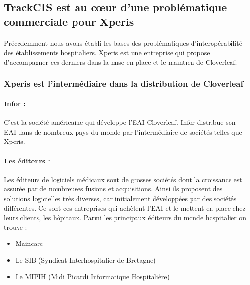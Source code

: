	\subsection{TrackCIS est au cœur d'une problématique commerciale pour Xperis}
		\paragraph{}
		Précédemment nous avons établi les bases des problématiques d'interopérabilité
		des établissements hospitaliers. Xperis est une entreprise qui propose
		d'accompagner ces derniers dans la mise en place et le maintien de Cloverleaf.
		
		\subsubsection{Xperis est l'intermédiaire dans la distribution de Cloverleaf}
			\paragraph{Infor :}
			C'est la société américaine qui développe l'EAI Cloverleaf. Infor distribue
			son EAI dans de nombreux pays du monde par l'intermédiaire de sociétés
			telles que Xperis.
			
			\paragraph{Les éditeurs :}
			Les éditeurs de logiciels médicaux sont de grosses sociétés dont la
			croissance est assurée par de nombreuses fusions et acquisitions. Ainsi ils
			proposent des solutions logicielles très diverses, car initialement
			développées par des sociétés différentes. Ce sont ces entreprises qui
			achètent l'EAI et le mettent en place chez leurs clients, les hôpitaux. Parmi
			les principaux éditeurs du monde hospitalier on trouve :
			\begin{itemize}
				\item Maincare
				\item Le SIB (Syndicat Interhospitalier de Bretagne)
				\item Le MIPIH (Midi Picardi Informatique Hospitalière)
			\end{itemize}
			
